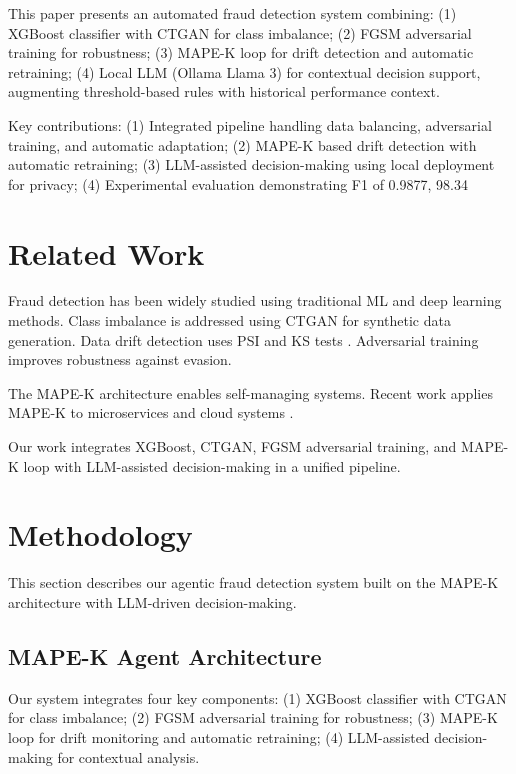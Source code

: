 \documentclass{svproc}
\begin{document}
This paper presents an automated fraud detection system combining: (1) XGBoost classifier with CTGAN for class imbalance; (2) FGSM adversarial training for robustness; (3) MAPE-K loop for drift detection and automatic retraining; (4) Local LLM (Ollama Llama 3) for contextual decision support, augmenting threshold-based rules with historical performance context.

Key contributions: (1) Integrated pipeline handling data balancing, adversarial training, and automatic adaptation; (2) MAPE-K based drift detection with automatic retraining; (3) LLM-assisted decision-making using local deployment for privacy; (4) Experimental evaluation demonstrating F1 of 0.9877, 98.34%

\section{Related Work}\label{sec:related}
Fraud detection has been widely studied using traditional ML and deep learning methods. Class imbalance is addressed using CTGAN \cite{xu2019ctgan} for synthetic data generation. Data drift detection uses PSI and KS tests \cite{goudar2026adaptive}. Adversarial training \cite{madry2018adversarial} improves robustness against evasion.

The MAPE-K architecture \cite{ibm2005autonomic} enables self-managing systems. Recent work applies MAPE-K to microservices \cite{bucchiarone2022mape} and cloud systems \cite{oh2023mape}. 

Our work integrates XGBoost, CTGAN, FGSM adversarial training, and MAPE-K loop with LLM-assisted decision-making in a unified pipeline.

\section{Methodology}

This section describes our agentic fraud detection system built on the MAPE-K architecture with LLM-driven decision-making.

\subsection{MAPE-K Agent Architecture}

Our system integrates four key components: (1) XGBoost classifier with CTGAN for class imbalance; (2) FGSM adversarial training for robustness; (3) MAPE-K loop for drift monitoring and automatic retraining; (4) LLM-assisted decision-making for contextual analysis.
\end{document}
